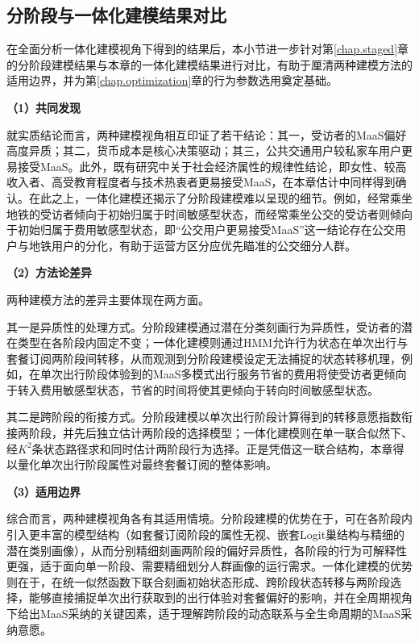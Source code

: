 \subsection{分阶段与一体化建模结果对比}\label{subsec.int.disc.compare}

在全面分析一体化建模视角下得到的结果后，本小节进一步针对第\ref{chap.staged}章的分阶段建模结果与本章的一体化建模结果进行对比，有助于厘清两种建模方法的适用边界，并为第\ref{chap.optimization}章的行为参数选用奠定基础。

\textbf{（1）共同发现}

就实质结论而言，两种建模视角相互印证了若干结论：其一，受访者的MaaS偏好高度异质；其二，货币成本是核心决策驱动；其三，公共交通用户较私家车用户更易接受MaaS。此外，既有研究中关于社会经济属性的规律性结论，即女性、较高收入者、高受教育程度者与技术热衷者更易接受MaaS，在本章估计中同样得到确认。在此之上，一体化建模还揭示了分阶段建模难以呈现的细节。例如，经常乘坐地铁的受访者倾向于初始归属于时间敏感型状态，而经常乘坐公交的受访者则倾向于初始归属于费用敏感型状态，即``公交用户更易接受MaaS''这一结论存在公交用户与地铁用户的分化，有助于运营方区分应优先瞄准的公交细分人群。

\textbf{（2）方法论差异}

两种建模方法的差异主要体现在两方面。

其一是异质性的处理方式。分阶段建模通过潜在分类刻画行为异质性，受访者的潜在类型在各阶段内固定不变；一体化建模则通过HMM允许行为状态在单次出行与套餐订阅两阶段间转移，从而观测到分阶段建模设定无法捕捉的状态转移机理，例如，在单次出行阶段体验到的MaaS多模式出行服务节省的费用将使受访者更倾向于转入费用敏感型状态，节省的时间将使其更倾向于转向时间敏感型状态。

其二是跨阶段的衔接方式。分阶段建模以单次出行阶段计算得到的转移意愿指数衔接两阶段，并先后独立估计两阶段的选择模型；一体化建模则在单一联合似然下、经$K^2$条状态路径求和同时估计两阶段行为选择。正是凭借这一联合结构，本章得以量化单次出行阶段属性对最终套餐订阅的整体影响。

\textbf{（3）适用边界}

综合而言，两种建模视角各有其适用情境。分阶段建模的优势在于，可在各阶段内引入更丰富的模型结构（如套餐订阅阶段的属性无视、嵌套Logit巢结构与精细的潜在类别画像），从而分别精细刻画两阶段的偏好异质性，各阶段的行为可解释性更强，适于面向单一阶段、需要精细划分人群画像的运行需求。一体化建模的优势则在于，在统一似然函数下联合刻画初始状态形成、跨阶段状态转移与两阶段选择，能够直接捕捉单次出行获取到的出行体验对套餐偏好的影响，并在全周期视角下给出MaaS采纳的关键因素，适于理解跨阶段的动态联系与全生命周期的MaaS采纳意愿。

